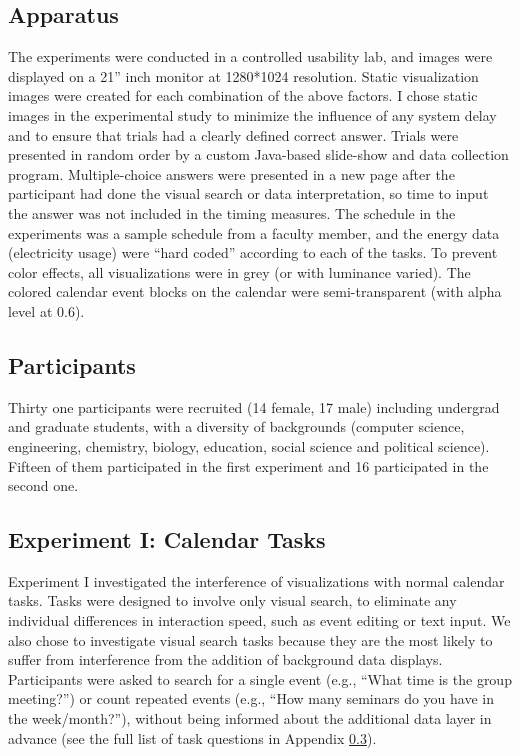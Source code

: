 \documentclass[12pt,oneside]{book}
\begin{document}
\subsection{Apparatus}
The experiments were conducted in a controlled usability lab, and images were displayed on a 21'' inch monitor at 1280*1024 resolution.  Static visualization images were created for each combination of the above factors.  I chose static images in the experimental study to minimize the influence of any system delay and to ensure that trials had a clearly defined correct answer.  Trials were presented in random order by a custom Java-based slide-show and data collection program.  Multiple-choice answers were presented in a new page after the participant had done the visual search or data interpretation, so time to input the answer was not included in the timing measures.
The schedule in the experiments was a sample schedule from a faculty member, and the energy data (electricity usage) were ``hard coded'' according to each of the tasks. To prevent color effects, all visualizations were in grey (or with luminance varied). The colored calendar event blocks on the calendar were semi-transparent (with alpha level at 0.6).

\subsection{Participants}
Thirty one participants were recruited (14 female, 17 male) including undergrad and graduate students, with a diversity of backgrounds (computer science, engineering, chemistry, biology, education, social science and political science). Fifteen of them participated in the first experiment and 16 participated in the second one.

\subsection {Experiment I: Calendar Tasks}
Experiment I investigated the interference of visualizations with normal calendar tasks.  Tasks were designed to involve only visual search, to eliminate any individual differences in interaction speed, such as event editing or text input.  We also chose to investigate visual search tasks because they are the most likely to suffer from interference from the addition of background data displays.  Participants were asked to search for a single event (e.g., ``What time is the group meeting?'') or count repeated events (e.g., ``How many seminars do you have in the week/month?''), without being informed about the additional data layer in advance (see the full list of task questions in Appendix \ref{}). 
\end{document}
